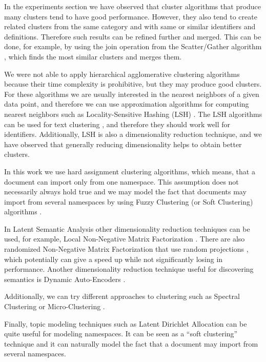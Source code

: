 In the experiments section we have observed that cluster algorithms that produce
many clusters tend to have good performance. However, they also tend to create related
clusters from the same category and with same or similar identifiers and
definitions. Therefore such results can be refined further and merged.
This can be done, for example, by using the join operation from
the Scatter/Gather algorithm \cite{cutting1992scatter}, which finds the most
similar clusters and merges them.

We were not able to apply hierarchical agglomerative clustering algorithms because
their time complexity is prohibitive, but they may produce good clusters.
For these algorithms we are usually interested in the nearest neighbors of a given
data point, and therefore we can use approximation algorithms for computing nearest
neighbors such as Locality-Sensitive Hashing (LSH) \cite{leskovec2014mining}.
The LSH algorithms can be used for text clustering \cite{ravichandran2005randomized},
and therefore they should work well for identifiers. Additionally, LSH is also a
dimensionality reduction technique, and we have observed that generally
reducing dimensionality helps to obtain better clusters.

In this work we use hard assignment clustering algorithms, which means, that a document
can import only from one namespace. This assumption does not necessarily always hold true
and we may model the fact that documents may import from several namespaces by
using Fuzzy Clustering (or Soft Clustering) algorithms \cite{baraldi1999survey}.

In Latent Semantic Analysis other dimensionality reduction techniques
can be used, for example, Local Non-Negative Matrix Factorization \cite{li2001learning}.
There are also randomized Non-Negative Matrix Factorization that use
random projections \cite{wang2010efficient} \cite{damle2014random},
which potentially can give a speed up while not significantly losing
in performance. Another dimensionality reduction technique useful for
discovering semantics is Dynamic Auto-Encoders \cite{mirowski2010dynamic}.

Additionally, we can try different approaches to clustering such as
Spectral Clustering \cite{ng2002spectral} or Micro-Clustering \cite{uno2015micro}.

Finally, topic modeling techniques such as Latent Dirichlet Allocation
\cite{blei2003latent} can be quite useful for modeling namespaces. It can be
seen as a ``soft clustering'' technique and it can naturally model the fact that
a document may import from several namespaces.


